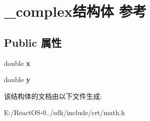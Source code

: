 \hypertarget{struct__complex}{}\section{\+\_\+complex结构体 参考}
\label{struct__complex}
\subsection*{Public 属性}
\begin{DoxyCompactItemize}
\item 
\mbox{\label{struct__complex_ac8f4005d1a9bcf48db38aff7bd324df0}} 
double {\bfseries x}
\item 
\mbox{\label{struct__complex_a0dd88e7ab6e7345cc2faae4fbc148cef}} 
double {\bfseries y}
\end{DoxyCompactItemize}


该结构体的文档由以下文件生成\+:\begin{DoxyCompactItemize}
\item 
E\+:/\+React\+O\+S-\/0../sdk/include/crt/math.\+h\end{DoxyCompactItemize}
